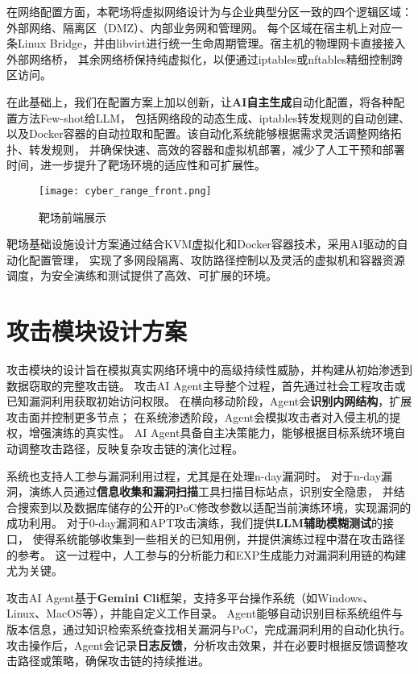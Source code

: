 \documentclass[lang=cn,10pt]{elegantbook}
\begin{document}
在网络配置方面，本靶场将虚拟网络设计为与企业典型分区一致的四个逻辑区域：外部网络、隔离区（DMZ）、内部业务网和管理网。
每个区域在宿主机上对应一条Linux Bridge，并由libvirt进行统一生命周期管理。宿主机的物理网卡直接接入外部网络桥，
其余网络桥保持纯虚拟化，以便通过iptables或nftables精细控制跨区访问。

在此基础上，我们在配置方案上加以创新，让\textbf{AI自主生成}自动化配置，将各种配置方法Few-shot给LLM，
包括网络段的动态生成、iptables转发规则的自动创建、
以及Docker容器的自动拉取和配置。该自动化系统能够根据需求灵活调整网络拓扑、转发规则，
并确保快速、高效的容器和虚拟机部署，减少了人工干预和部署时间，进一步提升了靶场环境的适应性和可扩展性。

\begin{figure}[htbp]
\centering
\texttt{[image: cyber\_range\_front.png]}  %
\caption{靶场前端展示}  %
\label{fig:front}  %
\end{figure}

\begin{definition}
    靶场基础设施设计方案通过结合KVM虚拟化和Docker容器技术，采用AI驱动的自动化配置管理，
    实现了多网段隔离、攻防路径控制以及灵活的虚拟机和容器资源调度，为安全演练和测试提供了高效、可扩展的环境。
\end{definition}


\section{攻击模块设计方案}

攻击模块的设计旨在模拟真实网络环境中的高级持续性威胁，并构建从初始渗透到数据窃取的完整攻击链。
攻击AI Agent主导整个过程，首先通过社会工程攻击或已知漏洞利用获取初始访问权限。
在横向移动阶段，Agent会\textbf{识别内网结构}，扩展攻击面并控制更多节点；
在系统渗透阶段，Agent会模拟攻击者对入侵主机的提权，增强演练的真实性。
AI Agent具备自主决策能力，能够根据目标系统环境自动调整攻击路径，反映复杂攻击链的演化过程。

系统也支持人工参与漏洞利用过程，尤其是在处理n-day漏洞时。
对于n-day漏洞，演练人员通过\textbf{信息收集和漏洞扫描}工具扫描目标站点，识别安全隐患，
并结合搜索到以及数据库储存的公开的PoC修改参数以适配当前演练环境，实现漏洞的成功利用。
对于0-day漏洞和APT攻击演练，我们提供\textbf{LLM辅助模糊测试}的接口，
使得系统能够收集到一些相关的已知用例，并提供演练过程中潜在攻击路径的参考。
这一过程中，人工参与的分析能力和EXP生成能力对漏洞利用链的构建尤为关键。

攻击AI Agent基于\textbf{Gemini Cli}框架，支持多平台操作系统（如Windows、Linux、MacOS等），并能自定义工作目录。
Agent能够自动识别目标系统组件与版本信息，通过知识检索系统查找相关漏洞与PoC，完成漏洞利用的自动化执行。
攻击操作后，Agent会记录\textbf{日志反馈}，分析攻击效果，并在必要时根据反馈调整攻击路径或策略，确保攻击链的持续推进。
\end{document}
